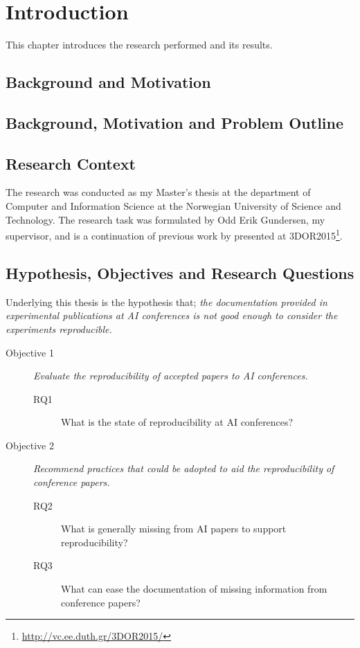
\chapter{Introduction}

This chapter introduces the research performed and its results.

\section{Background and Motivation}

\section{Background, Motivation and Problem Outline}
\section{Research Context}
The research was conducted as my Master's thesis at the department of Computer and Information Science at the Norwegian University of Science and Technology. The research task was formulated by Odd Erik Gundersen, my supervisor, and is a continuation of previous work by \citet{3dor.20151059} presented at 3DOR2015\footnote{\url{http://vc.ee.duth.gr/3DOR2015/}}.

\section{Hypothesis, Objectives and Research Questions}
Underlying this thesis is the hypothesis that; \textit{the documentation provided in experimental publications at AI conferences is not good enough to consider the experiments reproducible.}

\begin{description}
    \item[Objective 1] \textit{Evaluate the reproducibility of accepted papers to AI conferences.}
        \begin{description}
            \item[RQ1] What is the state of reproducibility at AI conferences?
        \end{description}
    \item[Objective 2] \textit{Recommend practices that could be adopted to aid the reproducibility of conference papers.}
        \begin{description}
            \item[RQ2] What is generally missing from AI papers to support reproducibility?
            \item[RQ3] What can ease the documentation of missing information from conference papers?
        \end{description}
\end{description}

